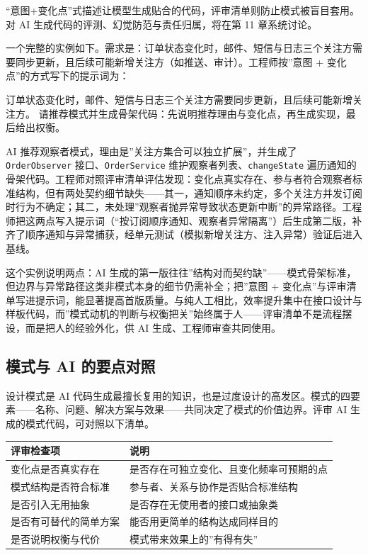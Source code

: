 \documentclass[12pt,a4paper,twoside,openany]{ctexbook}
\numberwithin{figure}{chapter}
\numberwithin{table}{chapter}
\newenvironment{Shaded}{}{}
\newcommand{\NormalTok}[1]{#1}
\newcounter{none}
\begin{document}
``意图+变化点''式描述让模型生成贴合的代码，评审清单则防止模式被盲目套用。对
AI 生成代码的评测、幻觉防范与责任归属，将在第 11 章系统讨论。

一个完整的实例如下。需求是：订单状态变化时，邮件、短信与日志三个关注方需要同步更新，且后续可能新增关注方（如推送、审计）。工程师按''意图
+ 变化点''的方式写下的提示词为：

\begin{Shaded}
\begin{Highlighting}[]
\NormalTok{订单状态变化时，邮件、短信与日志三个关注方需要同步更新，且后续可能新增关注方。}
\NormalTok{请推荐模式并生成骨架代码：先说明推荐理由与变化点，再生成实现，最后给出权衡。}
\end{Highlighting}
\end{Shaded}

AI 推荐观察者模式，理由是''关注方集合可以独立扩展''，并生成了
\texttt{OrderObserver} 接口、\texttt{OrderService}
维护观察者列表、\texttt{changeState}
遍历通知的骨架代码。工程师对照评审清单评估发现：变化点真实存在、参与者符合观察者标准结构，但有两处契约细节缺失------其一，通知顺序未约定，多个关注方并发订阅时行为不确定；其二，未处理''观察者抛异常导致状态更新中断''的异常路径。工程师把这两点写入提示词（``按订阅顺序通知、观察者异常隔离''）后生成第二版，补齐了顺序通知与异常捕获，经单元测试（模拟新增关注方、注入异常）验证后进入基线。

这个实例说明两点：AI
生成的第一版往往''结构对而契约缺''------模式骨架标准，但边界与异常路径这类非模式本身的细节仍需补全；把''意图
+
变化点''与评审清单写进提示词，能显著提高首版质量。与纯人工相比，效率提升集中在接口设计与样板代码，而''模式动机的判断与权衡把关''始终属于人------评审清单不是流程摆设，而是把人的经验外化，供
AI 生成、工程师审查共同使用。

\subsection{模式与 AI
的要点对照}\label{ux6a21ux5f0fux4e0e-ai-ux7684ux8981ux70b9ux5bf9ux7167}

设计模式是 AI
代码生成最擅长复用的知识，也是过度设计的高发区。模式的四要素------名称、问题、解决方案与效果------共同决定了模式的价值边界。评审
AI 生成的模式代码，可对照以下清单。

{\def\LTcaptype{none} %
\begin{longtable}[]{@{}ll@{}}
\toprule\noalign{}
评审检查项 & 说明 \\
\midrule\noalign{}
\endhead
\bottomrule\noalign{}
\endlastfoot
变化点是否真实存在 & 是否存在可独立变化、且变化频率可预期的点 \\
模式结构是否符合标准 & 参与者、关系与协作是否贴合标准结构 \\
是否引入无用抽象 & 是否存在无使用者的接口或抽象类 \\
是否有可替代的简单方案 & 能否用更简单的结构达成同样目的 \\
是否说明权衡与代价 & 模式带来效果上的''有得有失'' \\
\end{longtable}
}
\end{document}
